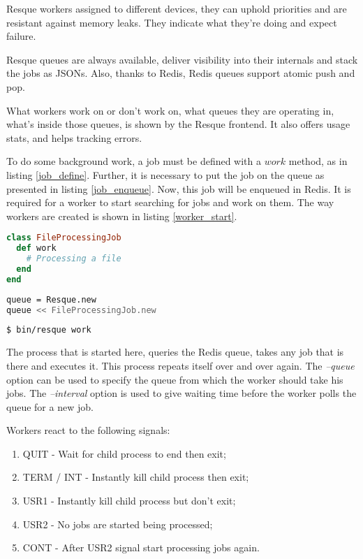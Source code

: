 Resque workers assigned to different devices, they can uphold priorities and are resistant against memory leaks. They indicate what they're doing and expect failure.

Resque queues are always available, deliver visibility into their internals and stack the jobs as JSONs. Also, thanks to Redis, Redis queues support atomic push and pop.

What workers work on or don't work on, what queues they are operating in, what's inside those queues, is shown by the Resque frontend. It also offers usage stats, and helps tracking errors.

To do some background work, a job must be defined with a $work$ method, as in listing \ref{job_define}. Further, it is necessary to put the job on the queue as presented in listing \ref{job_enqueue}. Now, this job will be enqueued in Redis. It is required for a worker to start searching for jobs and work on them. The way workers are created is shown in listing \ref{worker_start}.

\begin{lstlisting}[language=Ruby, caption={Defining a job class}, label=job_define]
class FileProcessingJob
  def work
    # Processing a file
  end
end
\end{lstlisting}


\begin{lstlisting}[language=Bash, caption={Enqueue a job}, label=job_enqueue]
queue = Resque.new
queue << FileProcessingJob.new
\end{lstlisting}

\begin{lstlisting}[language=Bash, caption={Create a worker}, label=worker_start]
$ bin/resque work
\end{lstlisting}

The process that is started here, queries the Redis queue, takes any job that is there and executes it. This process repeats itself over and over again. The \textit{--queue} option can be used to specify the queue from which the worker should take his jobs. The \textit{--interval} option is used to give waiting time before the worker polls the queue for a new job.

Workers react to the following signals:
\begin{enumerate}
  \item QUIT - Wait for child process to end then exit;
  \item TERM / INT - Instantly kill child process then exit;
  \item USR1 - Instantly kill child process but don't exit;
  \item USR2 - No jobs are started being processed;
  \item CONT - After USR2 signal start processing jobs again.
\end{enumerate}

